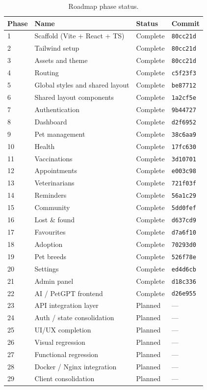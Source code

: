 \begin{center}
\begin{longtable}{@{}p{1.2cm}p{5.4cm}p{1.6cm}p{3.4cm}@{}}
\caption{Roadmap phase status.}
\label{tab:phases}\\
\toprule
\textbf{Phase} & \textbf{Name} & \textbf{Status} & \textbf{Commit} \\
\midrule
1 & Scaffold (Vite + React + TS) & Complete & \texttt{80cc21d} \\
2 & Tailwind setup & Complete & \texttt{80cc21d} \\
3 & Assets and theme & Complete & \texttt{80cc21d} \\
4 & Routing & Complete & \texttt{c5f23f3} \\
5 & Global styles and shared layout & Complete & \texttt{be87712} \\
6 & Shared layout components & Complete & \texttt{1a2cf5e} \\
7 & Authentication & Complete & \texttt{9b44727} \\
8 & Dashboard & Complete & \texttt{d2f6952} \\
9 & Pet management & Complete & \texttt{38c6aa9} \\
10 & Health & Complete & \texttt{17fc630} \\
11 & Vaccinations & Complete & \texttt{3d10701} \\
12 & Appointments & Complete & \texttt{e003c98} \\
13 & Veterinarians & Complete & \texttt{721f03f} \\
14 & Reminders & Complete & \texttt{56a1c29} \\
15 & Community & Complete & \texttt{5dd0fef} \\
16 & Lost \& found & Complete & \texttt{d637cd9} \\
17 & Favourites & Complete & \texttt{d7a6f10} \\
18 & Adoption & Complete & \texttt{70293d0} \\
19 & Pet breeds & Complete & \texttt{526f78e} \\
20 & Settings & Complete & \texttt{ed4d6cb} \\
21 & Admin panel & Complete & \texttt{d18c336} \\
22 & AI / PetGPT frontend & Complete & \texttt{d26e955} \\
23 & API integration layer & Planned & --- \\
24 & Auth / state consolidation & Planned & --- \\
25 & UI/UX completion & Planned & --- \\
26 & Visual regression & Planned & --- \\
27 & Functional regression & Planned & --- \\
28 & Docker / Nginx integration & Planned & --- \\
29 & Client consolidation & Planned & --- \\
\bottomrule
\end{longtable}
\end{center}

